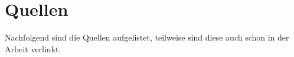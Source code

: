 \chapter{Quellen}
\label{chap:sources}

Nachfolgend sind die Quellen aufgelistet, teilweise sind diese auch schon in der Arbeit verlinkt.